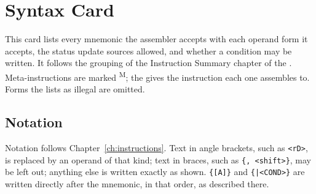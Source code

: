 \chapter{Syntax Card}
\label{appendix:syntax-card}

This card lists every mnemonic the assembler accepts with each operand form it accepts, the status update sources
allowed, and whether a condition may be written. It follows the grouping of the Instruction Summary chapter of the
\archmanual{}. Meta-instructions are marked \textsuperscript{M}; the \archmanual{} gives the instruction each one
assembles to. Forms the \archmanual{} lists as illegal are omitted.

\section{Notation}

Notation follows Chapter~\ref{ch:instructions}. Text in angle brackets, such as \texttt{<rD>}, is replaced by an
operand of that kind; text in braces, such as \texttt{\{, <shift>\}}, may be left out; anything else is written exactly
as shown. \texttt{\{[A]\}} and \texttt{\{|<COND>\}} are written directly after the mnemonic, in that order, as
described there.

